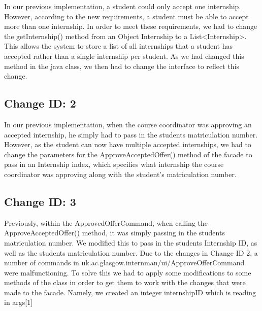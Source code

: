 \documentclass{l3deliverable}
\begin{document}
In our previous implementation, a student could only accept one internship. However, according to the new requirements, a student must be able to accept more than one internship. In order to meet these requirements, we had to change the getInternship() method from an Object Internship to a List<Internship>. This allows the system to store a list of all internships that a student has accepted rather than a single internship per student. As we had changed this method in the java class, we then had to change the interface to reflect this change.\\

\subsection{Change ID: 2}

In our previous implementation, when the course coordinator was approving an accepted internship, he simply had to pass in the students matriculation number. However, as the student can now have multiple accepted internships, we had to change the parameters for the ApproveAcceptedOffer() method of the facade to pass in an Internship index, which specifies what internship the course coordinator was approving along with the student's matriculation number.

\subsection{Change ID: 3}

Previously, within the ApprovedOfferCommand, when calling the ApproveAcceptedOffer() method, it was simply passing in the students matriculation number. We modified this to pass in the students Internship ID, as well as the students matriculation number. 
Due to the changes in Change ID 2, a number of commands in uk.ac.glasgow.internman/ui/ApproveOfferCommand were malfunctioning. To solve this we had to apply some modifications to some methods of the class in order to get them to work with the changes that were made to the facade. Namely, we created an integer internshipID which is reading in args[1] 
\end{document}
